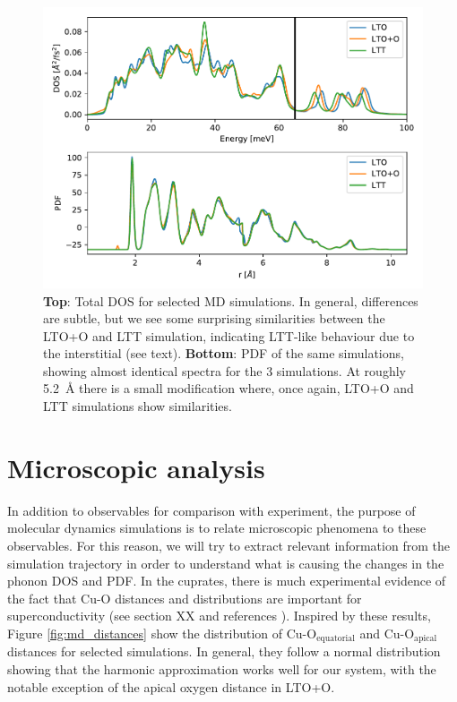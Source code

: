 \begin{figure}
	\centering
	\includegraphics[width=\textwidth]{fig/md/lto_ltt_ltoo_comparison.pdf}
	\caption[MD: DOS and PDF]{\textbf{Top}: Total DOS for selected MD simulations. In general, differences are subtle, but we see some surprising similarities between the LTO+O and LTT simulation, indicating LTT-like behaviour due to the interstitial (see text). \textbf{Bottom}: PDF of the same simulations, showing almost identical spectra for the 3 simulations. At roughly \SI{5.2}{\angstrom} there is a small modification where, once again, LTO+O and LTT simulations show similarities.}
	\label{fig:dos_pdf}
\end{figure}

\section{Microscopic analysis}
In addition to observables for comparison with experiment, the purpose of molecular dynamics simulations is to relate microscopic phenomena to these observables. For this reason, we will try to extract relevant information from the simulation trajectory in order to understand what is causing the changes in the phonon DOS and PDF. In the cuprates, there is much experimental evidence of the fact that Cu-O distances and distributions are important for superconductivity (see section XX and references \cite{Bozin2000, Peng2017, Ivashko2019}). Inspired by these results, Figure \ref{fig:md_distances} show the distribution of Cu-O$_\text{equatorial}$ and Cu-O$_\text{apical}$ distances for selected simulations. In general, they follow a normal distribution showing that the harmonic approximation works well for our system, with the notable exception of the apical oxygen distance in LTO+O. 

